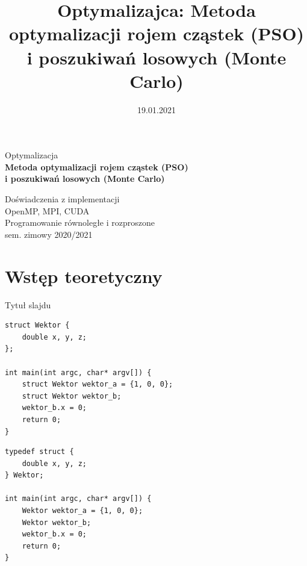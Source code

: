 \documentclass[handout]{beamer}
\date{19.01.2021}
\title{Optymalizajca: Metoda optymalizacji rojem cząstek (PSO) i poszukiwań losowych (Monte Carlo)}
\institute{Politechnika Warszawska}
\renewcommand*{\small}{\fontsize{8}{9.6}\selectfont}
\renewcommand*{\Large}{\fontsize{12}{14.4}\selectfont}
\renewcommand*{\LARGE}{\fontsize{14}{16.8}\selectfont}
\begin{document}
\begin{frame}


\begin{center}
\vspace{.3cm}
Optymalizacja \\

\vspace{.3cm}
{\LARGE \textbf{Metoda optymalizacji rojem cząstek (PSO) \\ i poszukiwań losowych (Monte Carlo)}}

\vspace{.8cm}
{\Large Doświadczenia z implementacji} \\
\vspace{.2cm}
{\Large OpenMP, MPI, CUDA} \\

\vspace{1.2cm}
{\small Programowanie równoległe i rozproszone \\ sem. zimowy 2020/2021}
\end{center}


\end{frame}




\section{Wstęp teoretyczny}
\begin{frame}[fragile]{Tytuł slajdu}


\vspace{-.8cm}

\begin{lstlisting}[style=mycpp, caption={Definicja i użycie struktury}]
struct Wektor {
	double x, y, z;
};

int main(int argc, char* argv[]) {
	struct Wektor wektor_a = {1, 0, 0};
	struct Wektor wektor_b;
	wektor_b.x = 0;
	return 0;
}
\end{lstlisting}

\vspace{-.8cm}

\begin{lstlisting}[style=mycpp, caption={Deklaracja z użyciem \textit{typedef}}]
typedef struct {
	double x, y, z;
} Wektor;

int main(int argc, char* argv[]) {
	Wektor wektor_a = {1, 0, 0};
	Wektor wektor_b;
	wektor_b.x = 0;
	return 0;
}
\end{lstlisting}


\end{frame}
\end{document}
